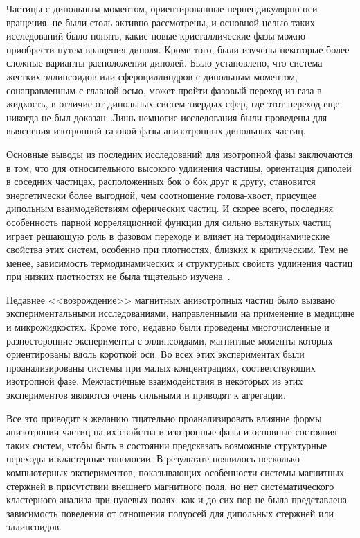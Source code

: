 \documentclass[a4paper,14pt]{extarticle}
\begin{document}
    Частицы с дипольным моментом, ориентированные перпендикулярно оси вращения, не были столь активно рассмотрены, и основной целью таких исследований было понять, какие новые кристаллические фазы можно приобрести путем вращения диполя. Кроме того, были изучены некоторые более сложные варианты расположения диполей. Было установлено, что система жестких эллипсоидов или сфероциллиндров с дипольным моментом, сонаправленным с главной осью, может пройти фазовый переход из
    газа в жидкость, в отличие от дипольных систем твердых сфер, где этот
    переход еще никогда не был доказан. Лишь немногие исследования были проведены для выяснения изотропной газовой фазы анизотропных дипольных частиц.


    Основные выводы из последних исследований для изотропной фазы
    заключаются в том, что для относительного высокого удлинения частицы, ориентация диполей в соседних частицах, расположенных бок о бок друг к другу, становится энергетически более выгодной, чем соотношение голова-хвост, присущее дипольным взаимодействиям сферических частиц. И скорее всего, последняя особенность парной корреляционной функции для сильно вытянутых частиц играет решающую роль в фазовом переходе и влияет на термодинамические свойства этих систем, особенно при плотностях, близких к критическим. Тем не менее, зависимость термодинамических и структурных свойств удлинения частиц при низких плотностях
    не была тщательно изучена~\cite{bib:two}.


    Недавнее <<возрождение>> магнитных анизотропных частиц было вызвано экспериментальными исследованиями, направленными на применение в медицине и микрожидкостях. Кроме того, недавно были проведены многочисленные и разносторонние эксперименты с эллипсоидами, магнитные моменты которых ориентированы вдоль короткой оси. Во всех этих экспериментах были проанализированы системы при малых концентрациях, соответствующих изотропной фазе. Межчастичные взаимодействия в некоторых из этих экспериментов являются очень сильными и приводят к агрегации.

    Все это приводит к желанию тщательно проанализировать влияние формы анизотропии частиц на их свойства и изотропные фазы и основные состояния таких систем, чтобы быть в состоянии предсказать возможные структурные переходы и кластерные топологии. В результате появилось несколько компьютерных экспериментов, показывающих особенности системы магнитных стержней в присутствии внешнего магнитного поля, но нет систематического кластерного анализа при нулевых полях, как и до сих пор не была представлена зависимость поведения от отношения полуосей
    для дипольных стержней или эллипсоидов.
\end{document}
